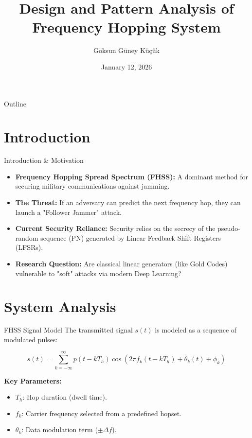 \documentclass[aspectratio=169, 11pt]{beamer}
\title{Design and Pattern Analysis of Frequency Hopping System}
\author{Göksun Güney Küçük}
\institute{Dept. of Electrical and Electronics Engineering, Boğaziçi University}
\date{January 12, 2026}
\begin{document}
\begin{frame}
    \titlepage
\end{frame}

\begin{frame}{Outline}
    \tableofcontents
\end{frame}

\section{Introduction}

\begin{frame}{Introduction \& Motivation}
    \begin{itemize}
        \item \textbf{Frequency Hopping Spread Spectrum (FHSS):} A dominant method for securing military communications against jamming.
        \item \textbf{The Threat:} If an adversary can predict the next frequency hop, they can launch a "Follower Jammer" attack.
        \item \textbf{Current Security Reliance:} Security relies on the secrecy of the pseudo-random sequence (PN) generated by Linear Feedback Shift Registers (LFSRs).
        \item \textbf{Research Question:} Are classical linear generators (like Gold Codes) vulnerable to "soft" attacks via modern Deep Learning?
    \end{itemize}
\end{frame}

\section{System Analysis}

\begin{frame}{FHSS Signal Model}
    The transmitted signal $s(t)$ is modeled as a sequence of modulated pulses:
    
    $$s(t)=\sum_{k=-\infty}^{\infty}p(t-kT_{h})\cos(2\pi f_{k}(t-kT_{h})+\theta_{k}(t)+\phi_{k})$$
    
    \vspace{1em}
    \textbf{Key Parameters:}
    \begin{itemize}
        \item $T_h$: Hop duration (dwell time).
        \item $f_k$: Carrier frequency selected from a predefined hopset.
        \item $\theta_k$: Data modulation term ($\pm \Delta f$).
    \end{itemize}
\end{frame}
\end{document}
